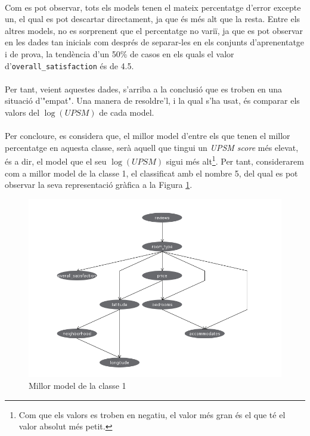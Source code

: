 	\\
	Com es pot observar, tots els models tenen el mateix percentatge d'error excepte un, el qual es pot descartar directament, ja que és més alt que la resta. Entre els altres models, no es sorprenent que el percentatge no variï, ja que es pot observar en les dades tan inicials com després de separar-les en els conjunts d'aprenentatge i de prova,  la tendència d'un 50\% de casos en els quals el valor d'\verb|overall_satisfaction| és de 4.5.\\
	\\
	Per tant, veient aquestes dades, s'arriba a la conclusió que es troben en una situació d'"empat". Una manera de resoldre'l, i la qual s'ha usat, és comparar els valors del $\log(UPSM)$ de cada model.
	\\
	\\
	Per concloure, es considera que, el millor model d'entre els que tenen el millor percentatge en aquesta classe, serà aquell que tingui un \textit{UPSM score} més elevat, és a dir, el model que el seu $\log(UPSM)$ sigui més alt\footnote{Com que els valors es troben en negatiu, el valor més gran és el que té el valor absolut més petit.}. Per tant, considerarem com a millor model de la classe 1, el classificat amb el nombre 5, del qual es pot observar la seva representació gràfica a la Figura \ref{fig:model1}.
	\begin{figure}[H]
		\centering
		\includegraphics[width=12cm]{imgs/modelclasse1.png}
		\caption{Millor model de la classe 1}
		\label{fig:model1}
	\end{figure}
	\vspace{0.5cm}
	
